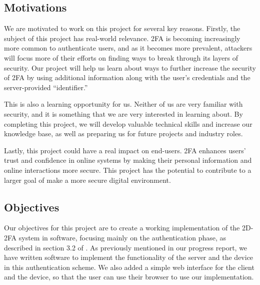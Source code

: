 \documentclass[11pt]{article} %
\begin{document}
\subsection{Motivations}

We are motivated to work on this project for several key reasons.
Firstly, the subject of this project has real-world relevance. 2FA is
becoming increasingly more common to authenticate users, and as it
becomes more prevalent, attackers will focus more of their efforts on
finding ways to break through its layers of security. Our project will
help us learn about ways to further increase the security of 2FA by
using additional information along with the user's credentials and the
server-provided ``identifier.''

This is also a learning opportunity for us. Neither of us are very
familiar with security, and it is something that we are very interested
in learning about. By completing this project, we will develop valuable
technical skills and increase our knowledge base, as well as preparing
us for future projects and industry roles.

Lastly, this project could have a real impact on end-users. 2FA enhances
users' trust and confidence in online systems by making their personal
information and online interactions more secure. This project has the
potential to contribute to a larger goal of make a more secure digital
environment. 

\subsection{Objectives}

Our objectives for this project are to create a working implementation
of the 2D-2FA system in software, focusing mainly on the authentication
phase, as described in section 3.2 of \cite{shirvanian2d2fa}. As
previously mentioned in our progress report, we have written software to
implement the functionality of the server and the device in this
authentication scheme. We also added a simple web interface for the
client and the device, so that the user can use their browser to use our
implementation. 
\end{document}
